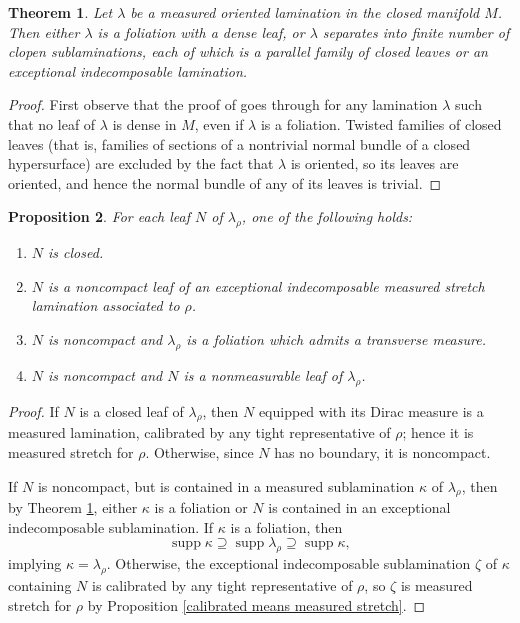 \documentclass[reqno,11pt]{amsart}
\DeclareMathOperator{\supp}{supp}
\newtheorem{theorem}{Theorem}[section]
\newtheorem{proposition}[theorem]{Proposition}
\theoremstyle{definition}
\numberwithin{equation}{section}
\begin{document}
\begin{theorem}\label{MorganShelan}
Let $\lambda$ be a measured oriented lamination in the closed manifold $M$.
Then either $\lambda$ is a foliation with a dense leaf, or $\lambda$ separates into finite number of clopen sublaminations, each of which is a parallel family of closed leaves or an exceptional indecomposable lamination.
\end{theorem}
\begin{proof}
First observe that the proof of \cite[Theorem I.3.2]{Morgan88} goes through for any lamination $\lambda$ such that no leaf of $\lambda$ is dense in $M$, even if $\lambda$ is a foliation.
Twisted families of closed leaves (that is, families of sections of a nontrivial normal bundle of a closed hypersurface) are excluded by the fact that $\lambda$ is oriented, so its leaves are oriented, and hence the normal bundle of any of its leaves is trivial.
\end{proof}

\begin{proposition}\label{classification of leaves}
For each leaf $N$ of $\lambda_\rho$, one of the following holds:
\begin{enumerate}
\item $N$ is closed.
\item $N$ is a noncompact leaf of an exceptional indecomposable measured stretch lamination associated to $\rho$.
\item $N$ is noncompact and $\lambda_\rho$ is a foliation which admits a transverse measure.
\item $N$ is noncompact and $N$ is a nonmeasurable leaf of $\lambda_\rho$.
\end{enumerate}
\end{proposition}
\begin{proof}
If $N$ is a closed leaf of $\lambda_\rho$, then $N$ equipped with its Dirac measure is a measured lamination, calibrated by any tight representative of $\rho$; hence it is measured stretch for $\rho$.
Otherwise, since $N$ has no boundary, it is noncompact.

If $N$ is noncompact, but is contained in a measured sublamination $\kappa$ of $\lambda_\rho$, then by Theorem \ref{MorganShelan}, either $\kappa$ is a foliation or $N$ is contained in an exceptional indecomposable sublamination.
If $\kappa$ is a foliation, then
$$\supp \kappa \supseteq \supp \lambda_\rho \supseteq \supp \kappa,$$
implying $\kappa = \lambda_\rho$.
Otherwise, the exceptional indecomposable sublamination $\zeta$ of $\kappa$ containing $N$ is calibrated by any tight representative of $\rho$, so $\zeta$ is measured stretch for $\rho$ by Proposition \ref{calibrated means measured stretch}.
\end{proof}
\end{document}
